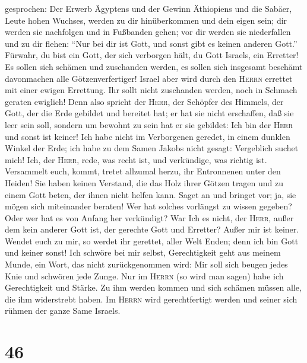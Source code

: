 gesprochen: Der Erwerb Ägyptens und der Gewinn Äthiopiens und die
Sabäer, Leute hohen Wuchses, werden zu dir hinüberkommen und dein eigen
sein; dir werden sie nachfolgen und in Fußbanden gehen; vor dir werden
sie niederfallen und zu dir flehen: ``Nur bei dir ist Gott, und sonst
gibt es keinen anderen Gott.''  Fürwahr, du bist ein
Gott, der sich verborgen hält, du Gott Israels, ein Erretter!
 Es sollen sich schämen und zuschanden werden, es sollen
sich insgesamt beschämt davonmachen alle Götzenverfertiger!
 Israel aber wird durch den \textsc{Herrn} errettet mit
einer ewigen Errettung. Ihr sollt nicht zuschanden werden, noch in
Schmach geraten ewiglich!  Denn also spricht der
\textsc{Herr}, der Schöpfer des Himmels, der Gott, der die Erde gebildet
und bereitet hat; er hat sie nicht erschaffen, daß sie leer sein soll,
sondern um bewohnt zu sein hat er sie gebildet: Ich bin der
\textsc{Herr} und sonst ist keiner!  Ich habe nicht im
Verborgenen geredet, in einem dunklen Winkel der Erde; ich habe zu dem
Samen Jakobs nicht gesagt: Vergeblich suchet mich! Ich, der
\textsc{Herr}, rede, was recht ist, und verkündige, was richtig ist.
 Versammelt euch, kommt, tretet allzumal herzu, ihr
Entronnenen unter den Heiden! Sie haben keinen Verstand, die das Holz
ihrer Götzen tragen und zu einem Gott beten, der ihnen nicht helfen
kann.  Saget an und bringet vor; ja, sie mögen sich
miteinander beraten! Wer hat solches vorlängst zu wissen gegeben? Oder
wer hat es von Anfang her verkündigt? War Ich es nicht, der
\textsc{Herr}, außer dem kein anderer Gott ist, der gerechte Gott und
Erretter? Außer mir ist keiner.  Wendet euch zu mir, so
werdet ihr gerettet, aller Welt Enden; denn ich bin Gott und keiner
sonst!  Ich schwöre bei mir selbst, Gerechtigkeit geht
aus meinem Munde, ein Wort, das nicht zurückgenommen wird: Mir soll sich
beugen jedes Knie und schwören jede Zunge.  Nur im
\textsc{Herrn} (so wird man sagen) habe ich Gerechtigkeit und Stärke. Zu
ihm werden kommen und sich schämen müssen alle, die ihm widerstrebt
haben.  Im \textsc{Herrn} wird gerechtfertigt werden und
seiner sich rühmen der ganze Same Israels.

\hypertarget{section-45}{%
\section{46}\label{section-45}}

